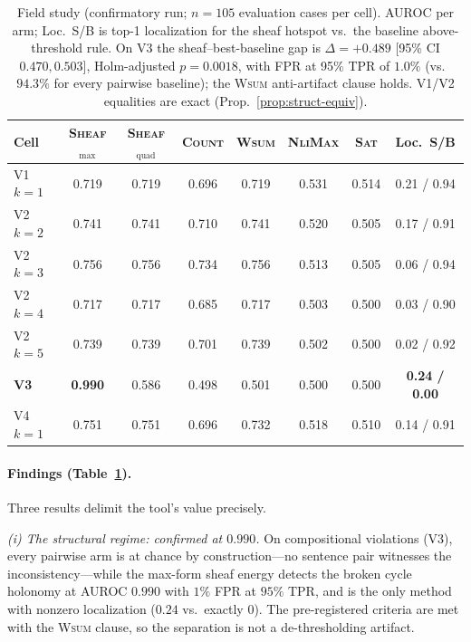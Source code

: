 \begin{table}[t]
\centering
\small
\begin{tabular}{lcccccc c}
\toprule
Cell & \textsc{Sheaf}$_{\max}$ & \textsc{Sheaf}$_{\mathrm{quad}}$ &
\textsc{Count} & \textsc{Wsum} & \textsc{NliMax} & \textsc{Sat} &
Loc.\ S/B\\
\midrule
V1 $k{=}1$ & 0.719 & 0.719 & 0.696 & 0.719 & 0.531 & 0.514 & 0.21 / 0.94\\
V2 $k{=}2$ & 0.741 & 0.741 & 0.710 & 0.741 & 0.520 & 0.505 & 0.17 / 0.91\\
V2 $k{=}3$ & 0.756 & 0.756 & 0.734 & 0.756 & 0.513 & 0.505 & 0.06 / 0.94\\
V2 $k{=}4$ & 0.717 & 0.717 & 0.685 & 0.717 & 0.503 & 0.500 & 0.03 / 0.90\\
V2 $k{=}5$ & 0.739 & 0.739 & 0.701 & 0.739 & 0.502 & 0.500 & 0.02 / 0.92\\
\textbf{V3} & \textbf{0.990} & 0.586 & 0.498 & 0.501 & 0.500 & 0.500 &
\textbf{0.24 / 0.00}\\
V4 $k{=}1$ & 0.751 & 0.751 & 0.696 & 0.732 & 0.518 & 0.510 & 0.14 / 0.91\\
\bottomrule
\end{tabular}
\caption{Field study (confirmatory run; $n=105$ evaluation cases per cell).
AUROC per arm; Loc.\ S/B is top-1 localization for the sheaf hotspot vs.\ the
baseline above-threshold rule. On V3 the sheaf--best-baseline gap is
$\Delta=+0.489$ [95\% CI $0.470,0.503$], Holm-adjusted $p=0.0018$, with
FPR at 95\% TPR of $1.0\%$ (vs.\ $94.3\%$ for every pairwise baseline); the
\textsc{Wsum} anti-artifact clause holds. V1/V2 equalities are exact
(Prop.~\ref{prop:struct-equiv}).}
\label{tab:field}
\end{table}

\paragraph{Findings (Table~\ref{tab:field}).} Three results delimit the
tool's value precisely.

\emph{(i) The structural regime: confirmed at $0.990$.} On compositional
violations (V3), every pairwise arm is at chance by construction---no sentence
pair witnesses the inconsistency---while the max-form sheaf energy detects the
broken cycle holonomy at AUROC $0.990$ with $1\%$ FPR at $95\%$ TPR, and is
the only method with nonzero localization ($0.24$ vs.\ exactly $0$). The
pre-registered criteria are met with the \textsc{Wsum} clause, so the
separation is not a de-thresholding artifact.

